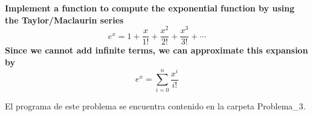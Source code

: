 \item \textbf{Implement a function to compute the exponential function by using the
    Taylor/Maclaurin series
    \begin{equation*}
        e^x= 1+ \frac{x}{1!}+\frac{x^2}{2!}+\frac{x^3}{3!}+ \cdots
    \end{equation*}
    Since we cannot add infinite terms, we can approximate this expansion by
    \begin{equation*}
        e^x= \sum_{i=0}^n \frac{x^i}{i!}
    \end{equation*}
}

El programa de este problema se encuentra contenido en la carpeta \textcolor{citecolor}{Problema\_3}.